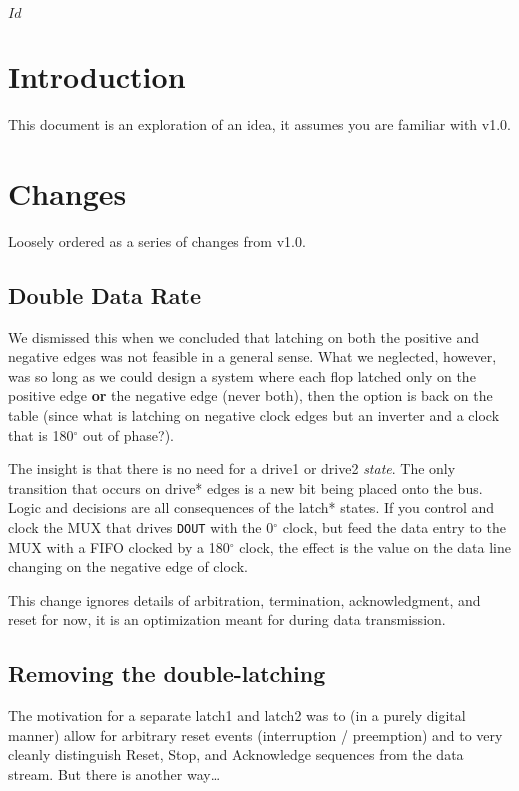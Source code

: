 \svnInfo $Id$

\section{Introduction}

This document is an exploration of an idea, it assumes you are familiar with
\bus v1.0.

\section{Changes}
Loosely ordered as a series of changes from v1.0.

\subsection{Double Data Rate}
We dismissed this when we concluded that latching on both the positive and
negative edges was not feasible in a general sense. What we neglected,
however, was so long as we could design a system where each flop latched only
on the positive edge {\bf or} the negative edge (never both), then the option
is back on the table (since what is latching on negative clock edges but an
inverter and a clock that is 180$^\circ$ out of phase?).

The insight is that there is no need for a {\sc drive1} or {\sc drive2} {\em
state}. The only transition that occurs on {\sc drive*} edges is a new bit
being placed onto the bus. Logic and decisions are all consequences of the
{\sc latch*} states. If you control and clock the MUX that drives {\tt DOUT}
with the 0$^\circ$ clock, but feed the data entry to the MUX with a FIFO
clocked by a 180$^\circ$ clock, the effect is the value on the data line
changing on the negative edge of clock.

This change ignores details of arbitration, termination, acknowledgment, and
reset for now, it is an optimization meant for during data transmission.

\subsection{Removing the double-latching}
The motivation for a separate {\sc latch1} and {\sc latch2} was to (in a
purely digital manner) allow for arbitrary reset events (interruption /
preemption) and to very cleanly distinguish Reset, Stop, and Acknowledge
sequences from the data stream. But there is another way\ldots

